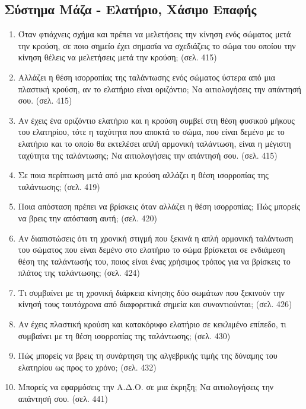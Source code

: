 \documentclass{article}
\begin{document}
\subsection{Σύστημα Μάζα - Ελατήριο, Χάσιμο Επαφής}

\begin{enumerate}
      \item Όταν φτιάχνεις σχήμα και πρέπει να μελετήσεις την κίνηση ενός σώματος μετά την κρούση, σε ποιο σημείο έχει σημασία να σχεδιάζεις το σώμα του οποίου την κίνηση θέλεις να μελετήσεις μετά την κρούση; (σελ. 415)

      \item Αλλάζει η θέση ισορροπίας της ταλάντωσης ενός σώματος ύστερα από μια πλαστική κρούση, αν το ελατήριο είναι οριζόντιο; Να αιτιολογήσεις την απάντησή σου. (σελ. 415)

      \item Αν έχεις ένα οριζόντιο ελατήριο και η κρούση συμβεί στη θέση φυσικού μήκους του ελατηρίου, τότε η ταχύτητα που αποκτά το σώμα, που είναι δεμένο με το ελατήριο και το οποίο θα εκτελέσει απλή αρμονική ταλάντωση, είναι η μέγιστη ταχύτητα της ταλάντωσης; Να αιτιολογήσεις την απάντησή σου. (σελ. 415)

      \item Σε ποια περίπτωση μετά από μια κρούση αλλάζει η θέση ισορροπίας της ταλάντωσης; (σελ. 419)

      \item Ποια απόσταση πρέπει να βρίσκεις όταν αλλάζει η θέση ισορροπίας; Πώς μπορείς να βρεις την απόσταση αυτή; (σελ. 420)

      \item Αν διαπιστώσεις ότι τη χρονική στιγμή που ξεκινά η απλή αρμονική ταλάντωση του σώματος που είναι δεμένο στο ελατήριο το σώμα βρίσκεται σε ενδιάμεση θέση της ταλάντωσής του, ποιος είναι ένας χρήσιμος τρόπος για να βρίσκεις το πλάτος της ταλάντωσης; (σελ. 424)

      \item Τι συμβαίνει με τη χρονική διάρκεια κίνησης δύο σωμάτων που ξεκινούν την κίνησή τους ταυτόχρονα από διαφορετικά σημεία και συναντιούνται; (σελ. 426)

      \item Αν έχεις πλαστική κρούση και κατακόρυφο ελατήριο σε κεκλιμένο επίπεδο, τι συμβαίνει με τη θέση ισορροπίας της ταλάντωσης; (σελ. 430)

      \item Πώς μπορείς να βρεις τη συνάρτηση της αλγεβρικής τιμής της δύναμης του ελατηρίου ως προς το χρόνο; (σελ. 432)

      \item Μπορείς να εφαρμόσεις την Α.Δ.Ο. σε μια έκρηξη; Να αιτιολογήσεις την απάντησή σου. (σελ. 441)
\end{enumerate}
\end{document}
